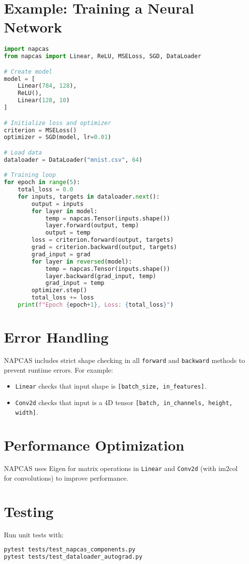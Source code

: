 \documentclass[a4paper,11pt]{article}
\begin{document}
\section{Example: Training a Neural Network}
\begin{lstlisting}[language=Python]
import napcas
from napcas import Linear, ReLU, MSELoss, SGD, DataLoader

# Create model
model = [
    Linear(784, 128),
    ReLU(),
    Linear(128, 10)
]

# Initialize loss and optimizer
criterion = MSELoss()
optimizer = SGD(model, lr=0.01)

# Load data
dataloader = DataLoader("mnist.csv", 64)

# Training loop
for epoch in range(5):
    total_loss = 0.0
    for inputs, targets in dataloader.next():
        output = inputs
        for layer in model:
            temp = napcas.Tensor(inputs.shape())
            layer.forward(output, temp)
            output = temp
        loss = criterion.forward(output, targets)
        grad = criterion.backward(output, targets)
        grad_input = grad
        for layer in reversed(model):
            temp = napcas.Tensor(inputs.shape())
            layer.backward(grad_input, temp)
            grad_input = temp
        optimizer.step()
        total_loss += loss
    print(f"Epoch {epoch+1}, Loss: {total_loss}")
\end{lstlisting}

\section{Error Handling}
NAPCAS includes strict shape checking in all \texttt{forward} and \texttt{backward} methods to prevent runtime errors. For example:
\begin{itemize}
    \item \texttt{Linear} checks that input shape is \texttt{[batch\_size, in\_features]}.
    \item \texttt{Conv2d} checks that input is a 4D tensor \texttt{[batch, in\_channels, height, width]}.
\end{itemize}

\section{Performance Optimization}
NAPCAS uses Eigen for matrix operations in \texttt{Linear} and \texttt{Conv2d} (with im2col for convolutions) to improve performance.

\section{Testing}
Run unit tests with:
\begin{lstlisting}[language=bash]
pytest tests/test_napcas_components.py
pytest tests/test_dataloader_autograd.py
\end{lstlisting}
\end{document}
